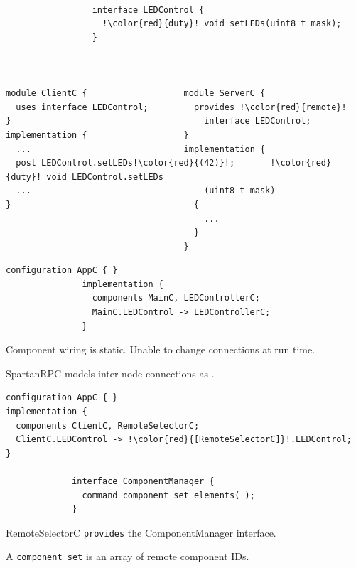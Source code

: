 
{\small
\begin{lstlisting}[language=nesC, escapechar=!]

                 interface LEDControl {
                   !\color{red}{duty}! void setLEDs(uint8_t mask);
                 }



module ClientC {                   module ServerC {
  uses interface LEDControl;         provides !\color{red}{remote}!
}                                      interface LEDControl;
implementation {                   }
  ...                              implementation {
  post LEDControl.setLEDs!\color{red}{(42)}!;       !\color{red}{duty}! void LEDControl.setLEDs
  ...                                  (uint8_t mask)
}                                    {
                                       ...
                                     }
                                   }
\end{lstlisting} 
}
\stopslide



{\small
\begin{lstlisting}[language=nesC]
               configuration AppC { }
               implementation {
                 components MainC, LEDControllerC;
                 MainC.LEDControl -> LEDControllerC;
               }
\end{lstlisting}
}

\begin{citemize}
\item Component wiring is static. Unable to change connections at run time.
\item SpartanRPC models inter-node connections as .
\end{citemize}
\stopslide


{\small
\begin{lstlisting}[language=nesC, escapechar=!]
configuration AppC { }
implementation {
  components ClientC, RemoteSelectorC;
  ClientC.LEDControl -> !\color{red}{[RemoteSelectorC]}!.LEDControl;
}

             interface ComponentManager {
               command component_set elements( );
             }
\end{lstlisting}
}

\begin{citemize}
  \item RemoteSelectorC \lstinline{provides} the ComponentManager interface.
  \item A \lstinline{component_set} is an array of remote component IDs.
\end{citemize}
\stopslide

